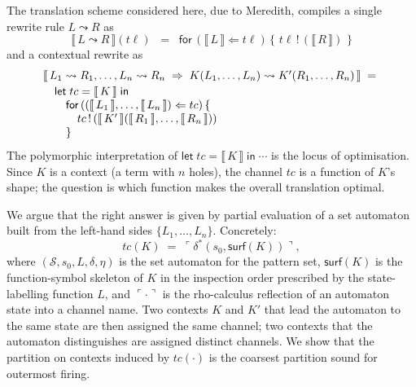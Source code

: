 \documentclass[11pt]{article}
\theoremstyle{plain}
\theoremstyle{definition}
\theoremstyle{remark}
\newcommand{\sem}[1]{\llbracket\,#1\,\rrbracket}
\newcommand{\reflect}[1]{\ulcorner #1 \urcorner}
\newcommand{\rew}{\leadsto}
\newcommand{\States}{\mathcal{S}}
\newcommand{\surface}{\mathsf{surf}}
\newcommand{\Send}[2]{#1 \,!\, (#2)}
\newcommand{\Recv}[3]{\mathsf{for}\,(#1 \Leftarrow #2)\,\{\,#3\,\}}
\newcommand{\Let}[3]{\mathsf{let}\;#1 = #2\;\mathsf{in}\;#3}
\begin{document}
The translation scheme considered here, due to Meredith, compiles a single
rewrite rule $L \rew R$ as
\begin{equation}\label{eq:single-rule}
\sem{L \rew R}(t\!\ell)
\;\;=\;\;
\Recv{\sem{L}}{t\!\ell}{\,\Send{t\!\ell}{\sem{R}}\,}
\end{equation}
and a contextual rewrite as
\begin{equation}\label{eq:context-rule}
\begin{array}{@{}l@{}}
\sem{L_{1} \rew R_{1}, \ldots, L_{n} \rew R_{n}
     \;\Rightarrow\; K(L_{1}, \ldots, L_{n}) \rew K'(R_{1}, \ldots, R_{n})} \;=\; \\[2pt]
\quad \mathsf{let}\;tc = \sem{K}\;\mathsf{in} \\
\quad\quad \mathsf{for}\,((\sem{L_{1}}, \ldots, \sem{L_{n}}) \Leftarrow tc)\,\{ \\
\quad\quad\quad \Send{tc}{\sem{K'}(\sem{R_{1}}, \ldots, \sem{R_{n}})} \\
\quad\quad \}
\end{array}
\end{equation}
The polymorphic interpretation of $\Let{tc}{\sem{K}}{\cdots}$ is the locus
of optimisation. Since $K$ is a context (a term with $n$ holes), the channel
$tc$ is a function of $K$'s shape; the question is which function makes the
overall translation optimal.

We argue that the right answer is given by partial evaluation of a
set automaton built from the left-hand sides $\{L_{1}, \ldots, L_{n}\}$.
Concretely:
\[
  tc(K) \;=\; \reflect{\delta^{*}(s_{0}, \surface(K))},
\]
where $(\States, s_{0}, L, \delta, \eta)$ is the set automaton for the
pattern set, $\surface(K)$ is the function-symbol skeleton of $K$ in the
inspection order prescribed by the state-labelling function $L$, and
$\reflect{\cdot}$ is the rho-calculus reflection of an automaton state into
a channel name. Two contexts $K$ and $K'$ that lead the automaton to the
same state are then assigned the same channel; two contexts that the
automaton distinguishes are assigned distinct channels. We show that the
partition on contexts induced by $tc(\cdot)$ is the coarsest partition
sound for outermost firing.
\end{document}
